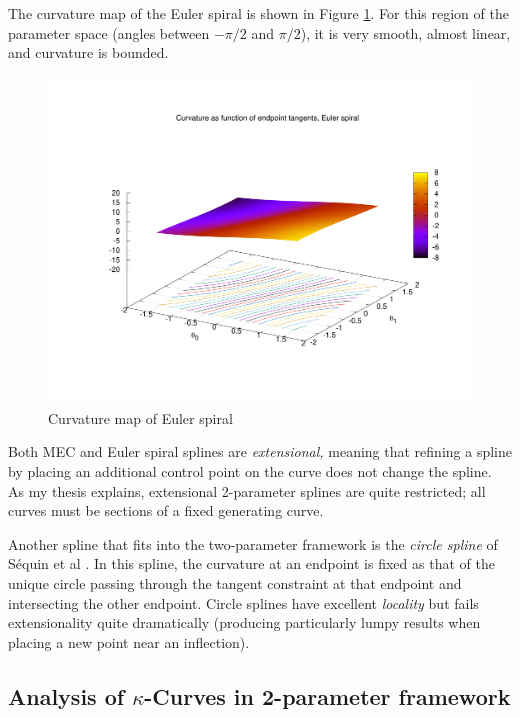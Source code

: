 \documentclass{article}
\newcommand{\kcurve}{$\kappa$-Curve}
\begin{document}
The curvature map of the Euler spiral is shown in Figure \ref{euler_kmap}. For this region of the parameter space (angles between $-\pi/2$ and $\pi/2$), it is very smooth, almost linear, and curvature is bounded.

\begin{figure}
\centering
\includegraphics[scale=0.5]{euler_kmap}
\caption{Curvature map of Euler spiral}
\label{euler_kmap}
\end{figure}

Both MEC and Euler spiral splines are \emph{extensional,} meaning that refining a spline by placing an additional control point on the curve does not change the spline. As my thesis explains, extensional 2-parameter splines are quite restricted; all curves must be sections of a fixed generating curve.

Another spline that fits into the two-parameter framework is the \emph{circle spline} of S{\'e}quin et al \cite{DBLP:journals/cad/SequinLY05}. In this spline, the curvature at an endpoint is fixed as that of the unique circle passing through the tangent constraint at that endpoint and intersecting the other endpoint. Circle splines have excellent \emph{locality} but fails extensionality quite dramatically (producing particularly lumpy results when placing a new point near an inflection).


\subsection{Analysis of \kcurve{}s in 2-parameter framework}
\end{document}
